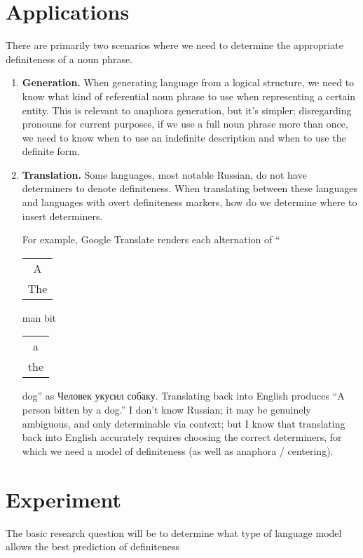 \documentclass[11pt]{article}
\begin{document}
\section{Applications}
There are primarily two scenarios where we need to determine the appropriate definiteness of a noun phrase.
\begin{enumerate}
  \item \textbf{Generation.} When generating language from a logical structure, we need to know what kind of referential noun phrase to use when representing a certain entity. This is relevant to anaphora generation, but it's simpler; disregarding pronouns for current purposes, if we use a full noun phrase more than once, we need to know when to use an indefinite description and when to use the definite form.
  \item \textbf{Translation.} Some languages, most notable Russian, do not have determiners to denote definiteness. When translating between these languages and languages with overt definiteness markers, how do we determine where to insert determiners.

  For example, Google Translate renders each alternation of ``\begin{tabular}{@{}c@{}}A\\The\end{tabular} man bit \begin{tabular}{@{}c@{}}a\\the\end{tabular} dog'' as \foreignlanguage{russian}{Человек укусил собаку.} Translating back into English produces ``A person bitten by a dog.'' I don't know Russian; it may be genuinely ambiguous, and only determinable via context; but I know that translating back into English accurately requires choosing the correct determiners, for which we need a model of definiteness (as well as anaphora / centering).


\end{enumerate}

\section{Experiment}
The basic research question will be to determine what type of language model allows the best prediction of definiteness
\end{document}
